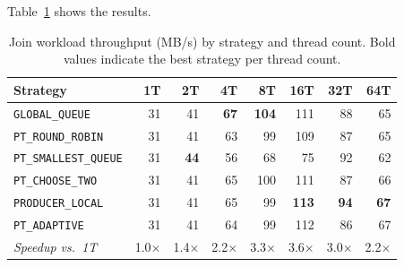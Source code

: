 Table~\ref{tab:join-strategies} shows the results.

\begin{table}[h]
\centering
\caption{Join workload throughput (MB/s) by strategy and thread count. Bold values indicate the best strategy per thread count.}
\label{tab:join-strategies}
\begin{tabular}{l|rrrrrrr}
\hline
\textbf{Strategy} & \textbf{1T} & \textbf{2T} & \textbf{4T} & \textbf{8T} & \textbf{16T} & \textbf{32T} & \textbf{64T} \\
\hline
\texttt{GLOBAL\_QUEUE}      & 31 & 41 & \textbf{67} & \textbf{104} & 111 & 88 & 65 \\
\texttt{PT\_ROUND\_ROBIN}   & 31 & 41 & 63 & 99 & 109 & 87 & 65 \\
\texttt{PT\_SMALLEST\_QUEUE}& 31 & \textbf{44} & 56 & 68 & 75 & 92 & 62 \\
\texttt{PT\_CHOOSE\_TWO}    & 31 & 41 & 65 & 100 & 111 & 87 & 66 \\
\texttt{PRODUCER\_LOCAL}    & 31 & 41 & 65 & 99 & \textbf{113} & \textbf{94} & \textbf{67} \\
\texttt{PT\_ADAPTIVE}       & 31 & 41 & 64 & 99 & 112 & 86 & 67 \\
\hline
\textit{Speedup vs.\ 1T}   & 1.0$\times$ & 1.4$\times$ & 2.2$\times$ & 3.3$\times$ & 3.6$\times$ & 3.0$\times$ & 2.2$\times$ \\
\hline
\end{tabular}
\end{table}

